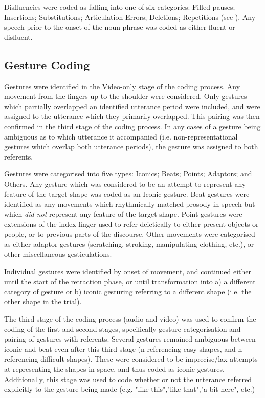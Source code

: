 \documentclass[a4paper,man,natbib]{apa6}
\begin{document}
Disfluencies were coded as falling into one of six categories: Filled pauses; Insertions; Substitutions; Articulation Errors; Deletions; Repetitions (see \citet{Shriberg1996}).
Any speech prior to the onset of the noun-phrase was coded as either fluent or disfluent.




\subsection{Gesture Coding}
Gestures were identified in the Video-only stage of the coding process.
Any movement from the fingers up to the shoulder were considered. 
Only gestures which partially overlapped an identified utterance period were included, and were assigned to the utterance which they primarily overlapped. 
This pairing was then confirmed in the third stage of the coding process. 
In any cases of a gesture being ambiguous as to which utterance it accompanied (i.e. non-representational gestures which overlap both utterance periods), the gesture was assigned to both referents.

Gestures were categorised into five types: Iconics; Beats; Points; Adaptors; and Others. 
Any gesture which was considered to be an attempt to represent any feature of the target shape was coded as an Iconic gesture.
Beat gestures were identified as any movements which rhythmically matched prosody in speech but which \emph{did not} represent any feature of the target shape.
Point gestures were extensions of the index finger used to refer deictically to either present objects or people, or to previous parts of the discourse.
Other movements were categorised as either adaptor gestures (scratching, stroking, manipulating clothing, etc.), or other miscellaneous gesticulations.

Individual gestures were identified by onset of movement, and continued either until the start of the retraction phase, or until transformation into a) a different category of gesture or b) iconic gesturing referring to a different shape (i.e. the other shape in the trial).

The third stage of the coding process (audio and video) was used to confirm the coding of the first and second stages, specifically gesture categorisation and pairing of gestures with referents.
Several gestures remained ambiguous between iconic and beat even after this third stage (n referencing easy shapes, and n referencing difficult shapes).%
These were considered to be imprecise/lax attempts at representing the shapes in space, and thus coded as iconic gestures.
Additionally, this stage was used to code whether or not the utterance referred explicitly to the gesture being made (e.g. "like this","like that","a bit here", etc.)
\end{document}
